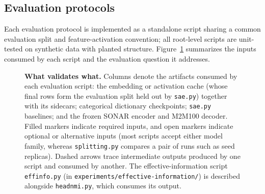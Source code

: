 \subsection{Evaluation protocols}
\label{app:protocols}

Each evaluation protocol is implemented as a standalone script sharing a
common evaluation split and feature-activation convention; all root-level
scripts are unit-tested on synthetic data with planted structure.
Figure~\ref{fig:evalpipeline} summarizes the inputs consumed by each script
and the evaluation question it addresses.

\begin{figure}[tp]
\centering
\resizebox{\linewidth}{!}{}
\caption[What validates what]{\textbf{What validates what.} Columns denote
	the artifacts consumed by each evaluation script: the embedding or
	activation cache (whose final rows form the evaluation split held out by
	\texttt{sae.py}) together with its sidecars; categorical dictionary
	checkpoints;
	\texttt{sae.py} baselines; and the frozen SONAR encoder and M2M100
	decoder. Filled markers indicate required inputs, and open markers
	indicate optional or alternative inputs (most scripts accept either
	model family, whereas \texttt{splitting.py} compares a pair of runs such
	as seed replicas). Dashed arrows trace intermediate outputs produced by
	one script and consumed by another. The effective-information script
	\texttt{effinfo.py} (in \texttt{experiments/\allowbreak effective-information/})
	is described alongside \texttt{headnmi.py}, which consumes its output.}
\label{fig:evalpipeline}
\end{figure}

